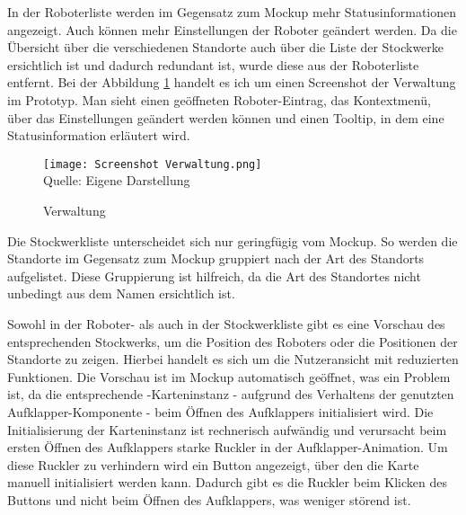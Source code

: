 In der Roboterliste werden im Gegensatz zum Mockup mehr Statusinformationen angezeigt. Auch können mehr Einstellungen der Roboter geändert werden. Da die Übersicht über die verschiedenen Standorte auch über die Liste der Stockwerke ersichtlich ist und dadurch redundant ist, wurde diese aus der Roboterliste entfernt. Bei der Abbildung \ref{fig:RobotlistScreenshot} handelt es ich um einen Screenshot der Verwaltung im Prototyp. Man sieht einen geöffneten Roboter-Eintrag, das Kontextmenü, über das Einstellungen geändert werden können und einen Tooltip, in dem eine Statusinformation erläutert wird.

\begin{figure}[H]
    \caption{Verwaltung}\label{fig:RobotlistScreenshot}
    \texttt{[image: Screenshot Verwaltung.png]}
    \\
    Quelle: Eigene Darstellung
\end{figure}

Die Stockwerkliste unterscheidet sich nur geringfügig vom Mockup. So werden die Standorte im Gegensatz zum Mockup gruppiert nach der Art des Standorts aufgelistet. Diese Gruppierung ist hilfreich, da die Art des Standortes nicht unbedingt aus dem Namen ersichtlich ist.

Sowohl in der Roboter- als auch in der Stockwerkliste gibt es eine Vorschau des entsprechenden Stockwerks, um die Position des Roboters oder die Positionen der Standorte zu zeigen. Hierbei handelt es sich um die Nutzeransicht mit reduzierten Funktionen. Die Vorschau ist im Mockup automatisch geöffnet, was ein Problem ist, da die entsprechende \deckgl{}-Karteninstanz - aufgrund des Verhaltens der genutzten Aufklapper-Komponente - beim Öffnen des Aufklappers initialisiert wird. Die Initialisierung der \deckgl{} Karteninstanz ist rechnerisch aufwändig und verursacht beim ersten Öffnen des Aufklappers starke Ruckler in der Aufklapper-Animation. Um diese Ruckler zu verhindern wird ein Button angezeigt, über den die Karte manuell initialisiert werden kann. Dadurch gibt es die Ruckler beim Klicken des Buttons und nicht beim Öffnen des Aufklappers, was weniger störend ist.

